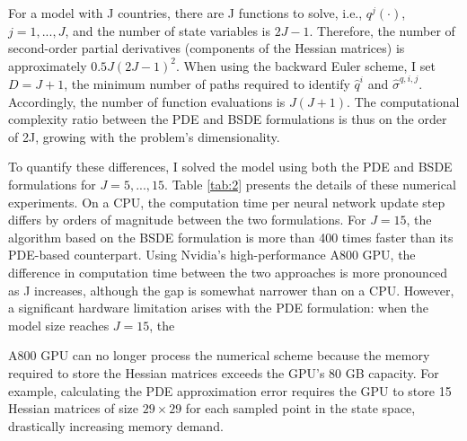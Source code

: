 \documentclass{article}
\begin{document}
For a model with J countries, there are J functions to solve, i.e., $q^{j}(\cdot)$, $j=1,...,J$, and the number of state variables is $2J-1$. Therefore, the number of second-order partial derivatives (components of the Hessian matrices) is approximately $0.5J(2J-1)^{2}$. When using the backward Euler scheme, I set $D=J+1$, the minimum number of paths required to identify $\hat{q}^{i}$ and $\hat{\sigma}^{q,i,j}$. Accordingly, the number of function evaluations is $J(J+1)$. The computational complexity ratio between the PDE and BSDE formulations is thus on the order of 2J, growing with the problem's dimensionality.

To quantify these differences, I solved the model using both the PDE and BSDE formulations for $J=5,...,15$. Table \ref{tab:2} presents the details of these numerical experiments. On a CPU, the computation time per neural network update step differs by orders of magnitude between the two formulations. For $J=15$, the algorithm based on the BSDE formulation is more than 400 times faster than its PDE-based counterpart. Using Nvidia's high-performance A800 GPU, the difference in computation time between the two approaches is more pronounced as J increases, although the gap is somewhat narrower than on a CPU. However, a significant hardware limitation arises with the PDE formulation: when the model size reaches $J=15$, the

\clearpage

A800 GPU can no longer process the numerical scheme because the memory required to store the Hessian matrices exceeds the GPU's 80 GB capacity. For example, calculating the PDE approximation error requires the GPU to store 15 Hessian matrices of size $29\times29$ for each sampled point in the state space, drastically increasing memory demand.
\end{document}
